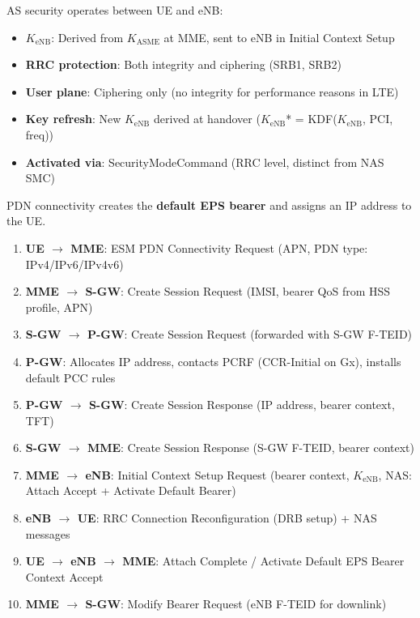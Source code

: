 
AS security operates between UE and eNB:

\begin{itemize}
\tightlist
\item
  \textbf{\ensuremath{K_{\mathrm{eNB}}}}: Derived from \ensuremath{K_{\mathrm{ASME}}} at MME, sent to eNB in Initial Context Setup
\item
  \textbf{RRC protection}: Both integrity and ciphering (SRB1, SRB2)
\item
  \textbf{User plane}: Ciphering only (no integrity for performance reasons in LTE)
\item
  \textbf{Key refresh}: New \ensuremath{K_{\mathrm{eNB}}} derived at handover (\ensuremath{K_{\mathrm{eNB}}}* = KDF(\ensuremath{K_{\mathrm{eNB}}}, PCI, freq))
\item
  \textbf{Activated via}: SecurityModeCommand (RRC level, distinct from NAS SMC)
\end{itemize}



\CNchained{}

PDN connectivity creates the \textbf{default EPS bearer} and assigns an IP address to the UE.


\begin{enumerate}
\def\labelenumi{\arabic{enumi}.}
\tightlist
\item
  \textbf{UE \ensuremath{\to} MME}: ESM PDN Connectivity Request (APN, PDN type: IPv4/\allowbreak{}IPv6/\allowbreak{}IPv4v6)
\item
  \textbf{MME \ensuremath{\to} S-GW}: Create Session Request (IMSI, bearer QoS from HSS profile, APN)
\item
  \textbf{S-GW \ensuremath{\to} P-GW}: Create Session Request (forwarded with S-GW F-TEID)
\item
  \textbf{P-GW}: Allocates IP address, contacts PCRF (CCR-Initial on Gx), installs default PCC rules
\item
  \textbf{P-GW \ensuremath{\to} S-GW}: Create Session Response (IP address, bearer context, TFT)
\item
  \textbf{S-GW \ensuremath{\to} MME}: Create Session Response (S-GW F-TEID, bearer context)
\item
  \textbf{MME \ensuremath{\to} eNB}: Initial Context Setup Request (bearer context, \ensuremath{K_{\mathrm{eNB}}}, NAS: Attach Accept + Activate Default Bearer)
\item
  \textbf{eNB \ensuremath{\to} UE}: RRC Connection Reconfiguration (DRB setup) + NAS messages
\item
  \textbf{UE \ensuremath{\to} eNB \ensuremath{\to} MME}: Attach Complete /\allowbreak{} Activate Default EPS Bearer Context Accept
\item
  \textbf{MME \ensuremath{\to} S-GW}: Modify Bearer Request (eNB F-TEID for downlink)
\end{enumerate}

